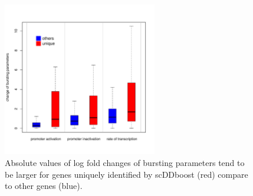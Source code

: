 \documentclass[aoas,preprint]{imsart}
\begin{document}
\begin{figure}[H]
\includegraphics[width = 0.6\textwidth]{Figs/D3E_box.pdf}
\caption{ Absolute values of log fold changes of bursting parameters tend to be larger for genes uniquely identified by scDDboost (red) compare to other genes (blue).}
 \label{fig:bursting}
\end{figure}

\end{document}
